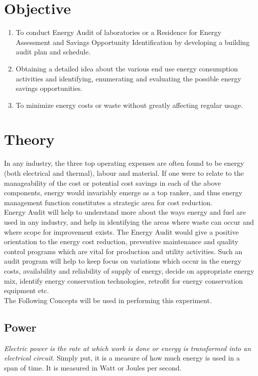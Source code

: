 \documentclass[11pt,a4paper]{article}
\begin{document}
	
\tableofcontents
\thispagestyle{empty}
\pagebreak


\setcounter{page}{1}

\section{Objective}
\begin{enumerate}
	\item To conduct Energy Audit of laboratories or a Residence for Energy Assessment and Savings Opportunity Identification by developing a building audit plan and schedule.
	\item Obtaining a detailed idea about the various end use energy consumption activities and identifying, enumerating and evaluating the possible energy savings opportunities.
	\item To minimize energy costs or waste without greatly affecting regular usage. 
\end{enumerate}
\section{Theory}
In any industry, the three top operating expenses are often found to be energy (both electrical and thermal), labour and material. If one were to relate to the manageability of the cost or potential cost savings in each of the above components, energy would invariably emerge as a top ranker, and thus energy management function constitutes a strategic area for cost reduction.\\

Energy Audit will help to understand more about the ways energy and fuel are used in any industry, and help in identifying the areas where waste can occur and where scope for improvement exists. The Energy Audit would give a positive orientation to the energy cost reduction, preventive maintenance and quality control programs which are vital for production and utility activities. Such an audit program will help to keep focus on variations which occur in the energy costs, availability and reliability of supply of energy, decide on appropriate energy mix, identify energy conservation technologies, retrofit for energy conservation equipment etc.\\

\noindent
The Following Concepts will be used in performing this experiment.

\subsection{Power}
\textit{Electric power is the rate at which work is done or energy is transformed into an electrical circuit}. Simply put, it is a measure of how much energy is used in a span of time.
It is measured in Watt or Joules per second. 
\end{document}
